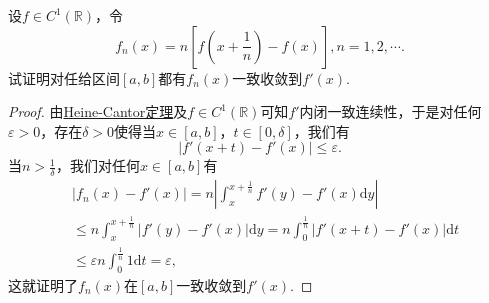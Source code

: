 \documentclass[../../main.tex]{subfiles}%
\begin{document}
\begin{example}
设\(f \in C^1(\mathbb{R})\)，令
\[
f_n(x) = n \left[ f \left( x + \frac{1}{n} \right) - f(x) \right], n = 1, 2, \cdots.
\]
试证明对任给区间\([a, b]\)都有\(f_n(x)\)一致收敛到\(f'(x)\).
\end{example}
\begin{proof}

由\hyperref[theroem:Heine-Cantor定理]{Heine-Cantor定理}及\(f \in C^1(\mathbb{R})\)可知\(f'\)内闭一致连续性，于是对任何\(\varepsilon > 0\)，存在\(\delta > 0\)使得当\(x \in [a, b]\)，\(t \in [0, \delta]\)，我们有
\[
|f'(x + t) - f'(x)| \leqslant \varepsilon.
\]
当\(n > \frac{1}{\delta}\)，我们对任何\(x \in [a, b]\)有
\begin{align*}
&|f_n(x) - f'(x)| = n \left| \int_{x}^{x + \frac{1}{n}} f'(y) - f'(x) \mathrm{d}y \right| \\
&\leqslant n \int_{x}^{x + \frac{1}{n}} |f'(y) - f'(x)| \mathrm{d}y = n \int_{0}^{\frac{1}{n}} |f'(x + t) - f'(x)| \mathrm{d}t \\
&\leqslant \varepsilon n \int_{0}^{\frac{1}{n}} 1 \mathrm{d}t = \varepsilon,
\end{align*}
这就证明了\(f_n(x)\)在\([a, b]\)一致收敛到\(f'(x)\).

\end{proof}
\end{document}
